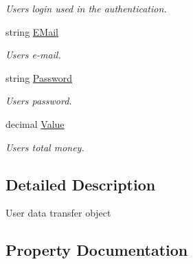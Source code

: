 \begin{DoxyCompactItemize}
\begin{DoxyCompactList}\small\item\em User\textquotesingle{}s login used in the authentication. \end{DoxyCompactList}\item 
string \mbox{\hyperlink{class_gielda_l2_1_1_i_n_f_r_a_s_t_r_u_c_t_u_r_e_1_1_d_t_o_1_1_user_d_t_o_acc22a60a7f06ecd0ff22e751d1b17ff6}{E\+Mail}}
\begin{DoxyCompactList}\small\item\em User\textquotesingle{}s e-\/mail. \end{DoxyCompactList}\item 
string \mbox{\hyperlink{class_gielda_l2_1_1_i_n_f_r_a_s_t_r_u_c_t_u_r_e_1_1_d_t_o_1_1_user_d_t_o_a028b87e2de3d5d05ae2364f697b52f9c}{Password}}
\begin{DoxyCompactList}\small\item\em User\textquotesingle{}s password. \end{DoxyCompactList}\item 
decimal \mbox{\hyperlink{class_gielda_l2_1_1_i_n_f_r_a_s_t_r_u_c_t_u_r_e_1_1_d_t_o_1_1_user_d_t_o_a39911edf0bf2a44d765aad6c7807b809}{Value}}
\begin{DoxyCompactList}\small\item\em User\textquotesingle{}s total money. \end{DoxyCompactList}\end{DoxyCompactItemize}


\subsection{Detailed Description}
User data transfer object 



\subsection{Property Documentation}
\mbox{\label{class_gielda_l2_1_1_i_n_f_r_a_s_t_r_u_c_t_u_r_e_1_1_d_t_o_1_1_user_d_t_o_acc22a60a7f06ecd0ff22e751d1b17ff6}} 
